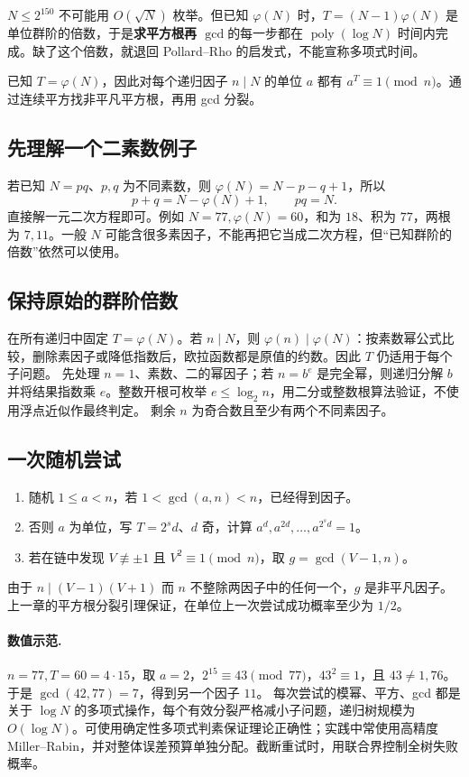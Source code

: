 \begin{tip}
$N\le2^{150}$ 不可能用 $O(\sqrt N)$ 枚举。但已知 $\varphi(N)$ 时，$T=(N-1)\varphi(N)$ 是单位群阶的倍数，于是\textbf{求平方根再 $\gcd$}的每一步都在 $\operatorname{poly}(\log N)$ 时间内完成。缺了这个倍数，就退回 Pollard--Rho 的启发式，不能宣称多项式时间。
\end{tip}

\hint 已知 $T=\varphi(N)$，因此对每个递归因子 $n\mid N$ 的单位 $a$ 都有 $a^T\equiv1\pmod n$。通过连续平方找非平凡平方根，再用 gcd 分裂。


\subsection{先理解一个二素数例子}
若已知 $N=pq$、$p,q$ 为不同素数，则 $\varphi(N)=N-p-q+1$，所以
\[
 p+q=N-\varphi(N)+1,\qquad pq=N.
\]
直接解一元二次方程即可。例如 $N=77,\varphi(N)=60$，和为 $18$、积为 $77$，两根为 $7,11$。一般 $N$ 可能含很多素因子，不能再把它当成二次方程，但“已知群阶的倍数”依然可以使用。

\subsection{保持原始的群阶倍数}
在所有递归中固定 $T=\varphi(N)$。若 $n\mid N$，则 $\varphi(n)\mid\varphi(N)$：按素数幂公式比较，删除素因子或降低指数后，欧拉函数都是原值的约数。因此 $T$ 仍适用于每个子问题。
先处理 $n=1$、素数、二的幂因子；若 $n=b^e$ 是完全幂，则递归分解 $b$ 并将结果指数乘 $e$。整数开根可枚举 $e\le\log_2n$，用二分或整数根算法验证，不使用浮点近似作最终判定。
剩余 $n$ 为奇合数且至少有两个不同素因子。

\subsection{一次随机尝试}
\begin{enumerate}
\item 随机 $1\le a<n$，若 $1<\gcd(a,n)<n$，已经得到因子。
\item 否则 $a$ 为单位，写 $T=2^sd$、$d$ 奇，计算 $a^d,a^{2d},\ldots,a^{2^sd}=1$。
\item 若在链中发现 $V\not\equiv\pm1$ 且 $V^2\equiv1\pmod n$，取 $g=\gcd(V-1,n)$。
\end{enumerate}
由于 $n\mid(V-1)(V+1)$ 而 $n$ 不整除两因子中的任何一个，$g$ 是非平凡因子。上一章的平方根分裂引理保证，在单位上一次尝试成功概率至少为 $1/2$。

\paragraph{数值示范.} $n=77,T=60=4\cdot15$，取 $a=2$，$2^{15}\equiv43\pmod{77}$，$43^2\equiv1$，且 $43\ne1,76$。于是 $\gcd(42,77)=7$，得到另一个因子 $11$。
\cost 每次尝试的模幂、平方、gcd 都是关于 $\log N$ 的多项式操作，每个有效分裂严格减小子问题，递归树规模为 $O(\log N)$。可使用确定性多项式判素保证理论正确性；实践中常使用高精度 Miller--Rabin，并对整体误差预算单独分配。截断重试时，用联合界控制全树失败概率。

